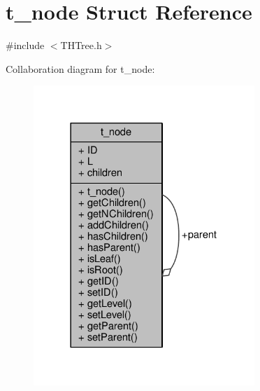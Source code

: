 \hypertarget{structt__node}{}\section{t\+\_\+node Struct Reference}
\label{structt__node}


{\ttfamily \#include $<$T\+H\+Tree.\+h$>$}



Collaboration diagram for t\+\_\+node\+:
\nopagebreak
\begin{figure}[H]
\begin{center}
\leavevmode
\includegraphics[width=237pt]{structt__node__coll__graph}
\end{center}
\end{figure}
